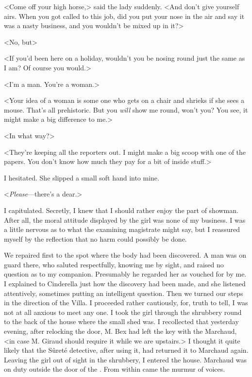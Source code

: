  <Come off your high horse,> said the lady suddenly. <And don't give yourself airs. When you got called to this job, did you put your nose in the air and say it was a nasty business, and you wouldn't be mixed up in it?> 

 <No, but\longdash> 

 <If you'd been here on a holiday, wouldn't you be nosing round just the same as I am? Of course you would.> 

 <I'm a man. You're a woman.> 

 <Your idea of a woman is some one who gets on a chair and shrieks if she sees a mouse. That's all prehistoric. But you \emph{will} show me round, won't you? You see, it might make a big difference to me.> 

 <In what way?> 

 <They're keeping all the reporters out. I might make a big scoop with one of the papers. You don't know how much they pay for a bit of inside stuff.> 

 I hesitated. She slipped a small soft hand into mine. 

 <\emph{Please}—there's a dear.> 

 I capitulated. Secretly, I knew that I should rather enjoy the part of showman. After all, the moral attitude displayed by the girl was none of my business. I was a little nervous as to what the examining magistrate might say, but I reassured myself by the reflection that no harm could possibly be done. 

 We repaired first to the spot where the body had been discovered. A man was on guard there, who saluted respectfully, knowing me by sight, and raised no question as to my companion. Presumably he regarded her as vouched for by me. I explained to Cinderella just how the discovery had been made, and she listened attentively, sometimes putting an intelligent question. Then we turned our steps in the direction of the Villa. I proceeded rather cautiously, for, truth to tell, I was not at all anxious to meet any one. I took the girl through the shrubbery round to the back of the house where the small shed was. I recollected that yesterday evening, after relocking the door, M. Bex had left the key with the  Marchaud, <in case M. Giraud should require it while we are upstairs.> I thought it quite likely that the Sûreté detective, after using it, had returned it to Marchaud again. Leaving the girl out of sight in the shrubbery, I entered the house. Marchaud was on duty outside the door of the . From within came the murmur of voices. 

